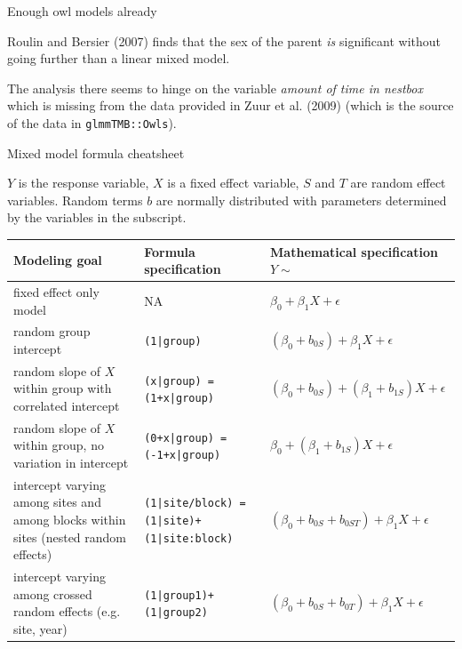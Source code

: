 \documentclass[
  ignorenonframetext,
]{beamer}
\begin{document}
\begin{frame}[fragile]{Enough owl models already}
\protect\hypertarget{enough-owl-models-already}{}

Roulin and Bersier (2007) finds that the sex of the parent \emph{is}
significant without going further than a linear mixed model.

The analysis there seems to hinge on the variable \emph{amount of time
in nestbox} which is missing from the data provided in Zuur et al.
(2009) (which is the source of the data in \texttt{glmmTMB::Owls}).

\end{frame}

\begin{frame}{Mixed model formula cheatsheet}
\protect\hypertarget{mixed-model-formula-cheatsheet}{}

\(Y\) is the response variable, \(X\) is a fixed effect variable, \(S\)
and \(T\) are random effect variables. Random terms \(b\) are normally
distributed with parameters determined by the variables in the
subscript.

\scriptsize
\begin{tabular}{p{3.5cm}|p{3.5cm}|p{3.5cm}}
Modeling goal & Formula specification & Mathematical specification $Y\sim$ \\
\hline
fixed effect only model & NA & $\beta_0 + \beta_1X + \epsilon$\\
random group intercept & \texttt{(1|group)} & $(\beta_0 + b_{0S}) + \beta_1X + \epsilon$\\
random slope of $X$ within group with correlated intercept & \texttt{(x|group) = (1+x|group)} 
& $(\beta_0 + b_{0S}) +  (\beta_1 + b_{1S}) X + \epsilon$\\
random slope of $X$ within group, no variation in intercept & \texttt{(0+x|group) = (-1+x|group)} 
& $\beta_0  +  (\beta_1 + b_{1S}) X + \epsilon$\\
intercept varying among sites and among blocks within sites (nested random effects) 
& \texttt{(1|site/block) = (1|site)+(1|site:block)} 
&  $(\beta_0 + b_{0S} + b_{0ST}) + \beta_1X + \epsilon$\\
intercept varying among crossed random effects (e.g. site, year) 
& \texttt{(1|group1)+(1|group2)} & $(\beta_0 + b_{0S} + b_{0T}) + \beta_1X + \epsilon$

\end{tabular}

\end{frame}
\end{document}
